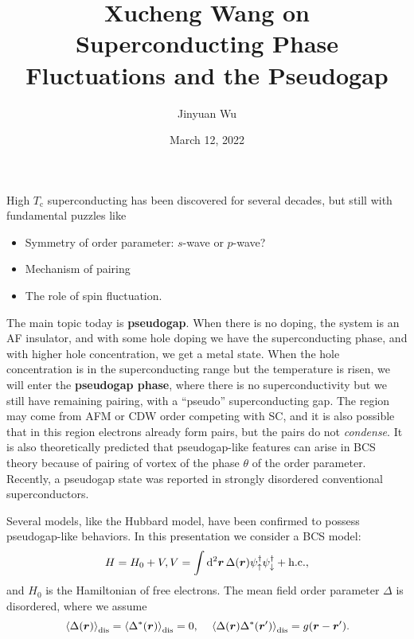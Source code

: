\documentclass[hyperref, a4paper]{article}
\title{Xucheng Wang on Superconducting Phase Fluctuations and the Pseudogap}
\author{Jinyuan Wu}
\date{March 12, 2022}
\newcommand*{\concept}[1]{{\textbf{#1}}}
\begin{document}
\maketitle

High $T_\text{c}$ superconducting has been discovered for several decades, but still with fundamental puzzles like
\begin{itemize}
    \item Symmetry of order parameter: $s$-wave or $p$-wave?
    \item Mechanism of pairing
    \item The role of spin fluctuation.
\end{itemize}
The main topic today is \concept{pseudogap}. When there is no doping, the system is an AF insulator, and with some 
hole doping we have the superconducting phase, and with higher hole concentration, we get a metal state.
When the hole concentration is in the superconducting range but the temperature is risen, we will 
enter the \concept{pseudogap phase}, where there is no superconductivity but we still have remaining
pairing, with a ``pseudo'' superconducting gap. The region may come from AFM or CDW order competing with 
SC, and it is also possible that in this region electrons already form pairs, but the pairs do not \emph{condense}.
It is also theoretically predicted that pseudogap-like features can arise in BCS theory because of pairing of 
vortex of the phase $\theta$ of the order parameter. Recently, a pseudogap state was reported in strongly 
disordered conventional superconductors.

Several models, like the Hubbard model, have been confirmed to possess pseudogap-like behaviors. 
In this presentation we consider a BCS model:
\begin{equation}
    H = H_0 + V, V = \int \dd[2]{\vb*{r}} \Delta(\vb*{r}) \psi^\dagger_{\uparrow} \psi^\dagger_{\downarrow} + \text{h.c.},
\end{equation}
and $H_0$ is the Hamiltonian of free electrons. The mean field order parameter $\Delta$ is disordered, where 
we assume 
\begin{equation}
    \expval*{\Delta(\vb*{r})}_\text{dis} = \expval{\Delta^*(\vb*{r})}_\text{dis} = 0, \quad 
    \expval*{\Delta(\vb*{r}) \Delta^*(\vb*{r}')}_\text{dis} = g(\vb*{r} - \vb*{r}').
    \label{eq:disordered-delta}
\end{equation}
\end{document}
